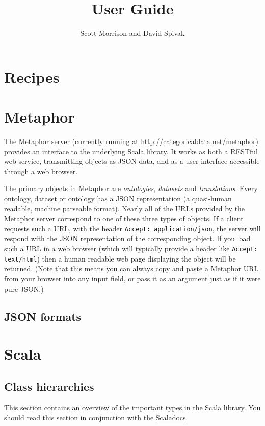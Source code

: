 \documentclass{amsart}
\title{User Guide}
\author{Scott Morrison and David Spivak}
\newcommand{\code}[1]{{\tt #1}}
\begin{document}
\maketitle

\section{Recipes}

\section{Metaphor}
The Metaphor server (currently running at \url{http://categoricaldata.net/metaphor}) provides an interface to the underlying Scala library. It works as both a RESTful web service, transmitting objects as JSON data, and as a user interface accessible through a web browser.

The primary objects in Metaphor are \emph{ontologies}, \emph{datasets} and \emph{translations}. Every ontology, dataset or ontology has a JSON representation (a quasi-human readable, machine parseable format). Nearly all of the URLs provided by the Metaphor server correspond to one of these three types of objects. If a client requests such a URL, with the header \code{Accept: application/json}, the server will respond with the JSON representation of the corresponding object. If you load such a URL in a web browser (which will typically provide a header like \code{Accept: text/html}) then a human readable web page displaying the object will be returned. (Note that this means you can always copy and paste a Metaphor URL from your browser into any input field, or pass it as an argument just as if it were pure JSON.)

\subsection{JSON formats}

\section{Scala}

\subsection{Class hierarchies}
This section contains an overview of the important types in the Scala library. You should read this section in conjunction with the \href{}{Scaladocs}.
\end{document}

